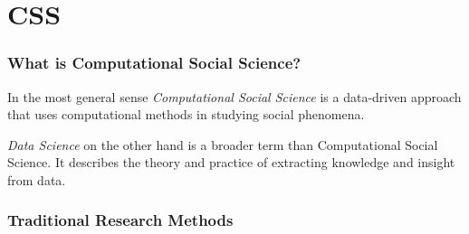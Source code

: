 \documentclass[aspectratio=169]{beamer}
\begin{document}
\section{CSS}

\begin{frame}
    \frametitle{What is Computational Social Science?}
    \begin{definition}{}
        In the most general sense \emph{Computational Social Science} is a data-driven approach that uses computational methods in studying social phenomena.
    \end{definition}
    \begin{definition}{}
        \emph{Data Science} on the other hand is a broader term than Computational Social Science. It describes the theory and practice of extracting knowledge and insight from data.
    \end{definition}


\end{frame}

\begin{frame}
    \frametitle{Traditional Research Methods}
\end{frame}
\end{document}

